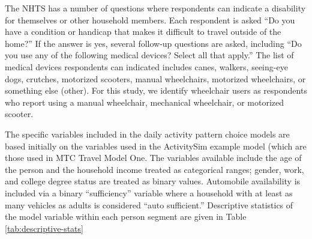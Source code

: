 \documentclass[3p, authoryear, review]{elsarticle} %
\begin{document}
The NHTS has a number of questions where respondents can indicate a disability
for themselves or other household members. Each respondent is asked ``Do you
have a condition or handicap that makes it difficult to travel outside of the
home?'' If the answer is yes, several follow-up questions are asked, including
``Do you use any of the following medical devices? Select all that apply.'' The
list of medical devices respondents can indicated includes canes, walkers,
seeing-eye dogs, crutches, motorized scooters, manual wheelchairs,
motorized wheelchairs, or something else (other).
For this study, we identify wheelchair users as respondents who report using a
manual wheelchair, mechanical wheelchair, or motorized scooter.

The specific variables included in the daily activity pattern choice models
are based initially on the variables used in the ActivitySim example model (which are
those used in MTC Travel Model One. The variables available include the age of
the person and the household income treated as categorical ranges; gender, work,
and college degree status are treated as binary values. Automobile availability is
included via a binary ``sufficiency'' variable where a household with at least as
many vehicles as adults is considered ``auto sufficient.'' Descriptive statistics
of the model variable within each person segment are given in
Table \ref{tab:descriptive-stats}
\end{document}
